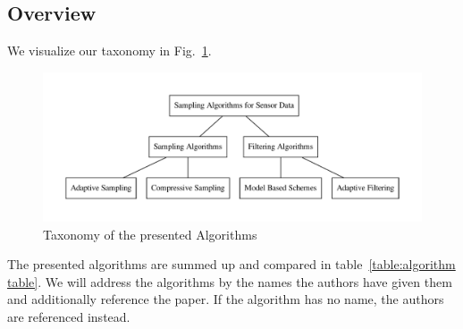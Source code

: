 \subsection{Overview}
\label{sec:Overview}

We visualize our taxonomy in Fig.~\ref{fig:Taxonomy}.

\begin{figure}[h]
\includegraphics[width=\linewidth]{images/taxonomy.pdf}
\caption{Taxonomy of the presented Algorithms}
\label{fig:Taxonomy}
\centering
\end{figure}

\FloatBarrier

The presented algorithms are summed up and compared in
table~\ref{table:algorithm table}. We will address the algorithms by the names
the authors have given them and additionally reference the paper. If the
algorithm has no name, the authors are referenced instead.

